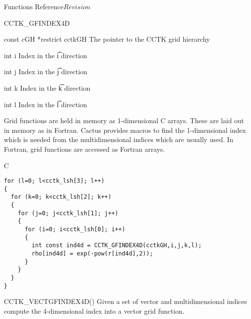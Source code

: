 \begin{cactuspart}{ Functions Reference}{}{$Revision$}
\begin{FunctionDescription}{CCTK\_GFINDEX4D}
\begin{ParameterSection}
\begin{Parameter} {const cGH *restrict cctkGH}
The pointer to the CCTK grid hierarchy
\end{Parameter}

\begin{Parameter} {int i}
Index in the \t{i} direction
\end{Parameter}

\begin{Parameter} {int j}
Index in the \t{j} direction
\end{Parameter}

\begin{Parameter} {int k}
Index in the \t{k} direction
\end{Parameter}

\begin{Parameter} {int l}
Index in the \t{l} direction
\end{Parameter}
\end{ParameterSection}

\begin{Discussion}
Grid functions are held in memory as 1-dimensional C arrays. These are
laid out in memory as in Fortran. Cactus provides macros to find the
1-dimensional index which is needed from the multidimensional indices which
are usually used. In Fortran, grid functions are accessed as Fortran arrays.
\end{Discussion}
\begin{ExampleSection}
\begin{Example}{C}
\begin{verbatim}
for (l=0; l<cctk_lsh[3]; l++)
{
  for (k=0; k<cctk_lsh[2]; k++)
  {
    for (j=0; j<cctk_lsh[1]; j++)
    {
      for (i=0; i<cctk_lsh[0]; i++)
      {
        int const ind4d = CCTK_GFINDEX4D(cctkGH,i,j,k,l);
        rho[ind4d] = exp(-pow(r[ind4d],2));
      }
    }
  }
}
\end{verbatim}
\end{Example}
\end{ExampleSection}
\begin{SeeAlsoSection}
\begin{SeeAlso}{CCTK\_VECTGFINDEX4D()}
Given a set of vector and multidimensional indices compute the 4-dimensional
index into a vector grid function.
\end{SeeAlso}

\end{SeeAlsoSection}
\end{FunctionDescription}



\end{cactuspart}
